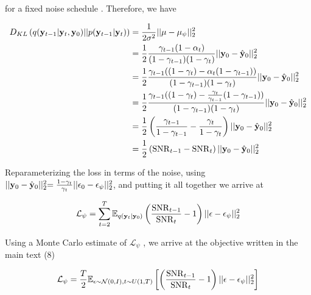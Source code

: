 \documentclass{article}
\begin{document}
for a fixed noise schedule \citep{Saharia2021}. Therefore, we have

\begin{align*}
D_{KL}\left(q(\bold{y}_{t-1}|\bold{y}_t,\bold{y}_0)\lvert\lvert p(\bold{y}_{t-1}|\bold{y}_t) \right) &= \frac{1}{2\sigma^{2}} \lvert\lvert \mu - \mu_{\psi} \lvert\lvert_{2}^{2} \\
&= \frac{1}{2}\frac{\gamma_{t-1}(1-\alpha_{t})}{(1-\gamma_{t-1})(1-\gamma_{t})}\lvert\lvert \bold{y}_{0} - \hat{\bold{y}}_{0} \lvert\lvert_{2}^{2}\\
&= \frac{1}{2}\frac{\gamma_{t-1}((1-\gamma_{t})-\alpha_{t}(1-\gamma_{t-1}))}{(1-\gamma_{t-1})(1-\gamma_{t})}\lvert\lvert \bold{y}_{0} - \hat{\bold{y}}_{0} \lvert\lvert_{2}^{2}\\
&= \frac{1}{2}\frac{\gamma_{t-1}((1-\gamma_{t})-\frac{\gamma_{t}}{\gamma_{t-1}}(1-\gamma_{t-1}))}{(1-\gamma_{t-1})(1-\gamma_{t})}\lvert\lvert \bold{y}_{0} - \hat{\bold{y}}_{0} \lvert\lvert_{2}^{2}\\
&= \frac{1}{2}\left(\frac{\gamma_{t-1}}{1-\gamma_{t-1}}-\frac{\gamma_{t}}{1-\gamma_{t}}\right)\lvert\lvert \bold{y}_{0} - \hat{\bold{y}}_{0} \lvert\lvert_{2}^{2}\\
&= \frac{1}{2}\left(\mathrm{SNR}_{t-1}-\mathrm{SNR}_{t}\right)\lvert\lvert \bold{y}_{0} - \hat{\bold{y}}_{0} \lvert\lvert_{2}^{2}
\end{align*}

Reparameterizing the loss in terms of the noise, using $\lvert\lvert \bold{y}_{0} - \hat{\bold{y}}_{0} \lvert\lvert_{2}^{2} = \frac{1-\gamma_{t}}{\gamma_{t}}\lvert\lvert \bold{\epsilon}_{0} - \epsilon_{\psi} \lvert\lvert_{2}^{2}$, and putting it all together we arrive at 

\begin{equation*}
\mathcal{L}_{\psi} = \sum_{t=2}^{T} \mathbb{E}_{q(\bold{y}_{t}|\bold{y}_{0})}\left(\frac{\mathrm{SNR}_{t-1}}{{\mathrm{SNR}_{t}}}-1\right)\lvert\lvert \bold{\epsilon}-\bold{\epsilon}_{\psi}\lvert\lvert_{2}^{2}
\end{equation*}

Using a Monte Carlo estimate of $\mathcal{L}_{\psi}$ \citep{Kingma2023}, we arrive at the objective written in the main text (8)

\begin{equation*}
\mathcal{L}_{\psi} = \frac{T}{2}\mathbb{E}_{\epsilon\sim \mathcal{N}(0,I),t\sim U(1,T)}\left[\left(\frac{\mathrm{SNR}_{t-1}}{{\mathrm{SNR}_{t}}}-1\right)\lvert\lvert \bold{\epsilon}-\bold{\epsilon}_{\psi}\lvert\lvert_{2}^{2}\right]
\end{equation*}
\end{document}
